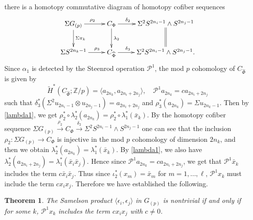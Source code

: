 \documentclass[12pt]{amsart}
\numberwithin{equation}{section}
\newtheorem{theorem}{Theorem}[section]
\theoremstyle{definition}
\theoremstyle{remark}
\begin{document}
there is a homotopy commutative diagram of homotopy cofiber sequences
$$\xymatrix{\Sigma G_{(p)}\ar[r]^{\rho_2}\ar[d]^{\Sigma\pi_k}&C_\Phi\ar[r]^(.3){\delta_2}\ar[d]^{\lambda_2}&\Sigma^2 S^{2n_i-1}\wedge S^{2n_j-1}\ar@{=}[d]\\
\Sigma S^{2n_k-1}\ar[r]^(.62){\rho_3}&C_{\widehat{\Phi}}\ar[r]^(.3){\delta_3}&\Sigma^2 S^{2n_i-1}\wedge S^{2n_j-1}.}$$
Since $\alpha_1$ is detected by the Steenrod operation $\mathcal{P}^1$, the mod $p$ cohomology of $C_{\widehat{\Phi}}$ is given by
$$\widetilde{H}^*(C_{\widehat{\Phi}};{\mathbb{Z}}/p)=\langle a_{2n_k},a_{2n_i+2n_j}\rangle,\quad\mathcal{P}^1a_{2n_k}=ca_{2n_i+2n_j}$$
such that $\delta_3^*(\Sigma^2u_{2n_i-1}\otimes u_{2n_j-1})=a_{2n_i+2n_j}$ and $\rho_3^*(a_{2n_k})=\Sigma u_{2n_k-1}$. Then by \eqref{lambda1}, we get $\rho_2^*\circ\lambda_2^*(a_{2n_k})=\rho_2^*\circ\lambda_1^*(\bar{x}_k)$. By the homotopy cofiber sequence $\Sigma G_{(p)}\xrightarrow{\rho_2}C_\Phi\xrightarrow{\delta_2}\Sigma^2S^{2n_i-1}\wedge S^{2n_j-1}$ one can see that the inclusion $\rho_2:\Sigma G_{(p)}\to C_\Phi$ is injective in the mod $p$ cohomology of dimension $2n_k$, and then we obtain $\lambda_2^*(a_{2n_k})=\lambda_1^*(\bar{x}_k)$. By \eqref{lambda1}, we also have $\lambda_2^*(a_{2n_i+2n_j})=\lambda_1^*(\bar{x}_i\bar{x}_j)$. Hence since $\mathcal{P}^1a_{2n_k}=ca_{2n_i+2n_j}$, we get that $\mathcal{P}^1\bar{x}_k$ includes the term $c\bar{x}_i\bar{x}_j$. Thus since $\iota_2^*(x_m)=\bar{x}_m$ for $m=1,\ldots,\ell$, $\mathcal{P}^1x_k$ must include the term $cx_ix_j$. Therefore we have established the following.

\begin{theorem}
\label{P}
The Samelson product $\langle\epsilon_i,\epsilon_j\rangle$ in $G_{(p)}$ is nontrivial if and only if for some $k$, $\mathcal{P}^1x_k$ includes the term $cx_ix_j$ with $c\ne 0$.
\end{theorem}
\end{document}

